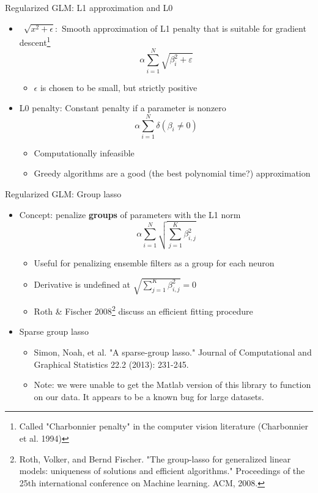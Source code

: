\documentclass[svgnames,13pt,handout]{beamer}
\DeclareRobustCommand{\emph}[1]{\textbf{{\color{emphasizecolor} #1}}}
\begin{document}
\begin{frame}{Regularized GLM: L1 approximation and L0}
\begin{itemize}
	\item <1->~$\sqrt{x^2+\epsilon}:$ Smooth approximation of L1 penalty that is suitable for gradient descent\footnote{Called "Charbonnier penalty" in the computer vision literature (Charbonnier et al. 1994)}\[ \alpha \sum_{i=1}^N \sqrt{\beta_i^2+\varepsilon} \]
	\begin{itemize}
		\item <2->$\epsilon$ is chosen to be small, but strictly positive
		\end{itemize}
	\item <3->L0 penalty: Constant penalty if a parameter is nonzero\[ \alpha \sum_{i=1}^N \delta(\beta_i\ne 0) \]
	\begin{itemize}
		\item <4->Computationally infeasible
		\item <5->Greedy algorithms are a good (the best polynomial time?) approximation
	\end{itemize}
\end{itemize}
\end{frame} 

\begin{frame}{Regularized GLM: Group lasso}
\begin{itemize}
	\item <1->Concept: penalize \emph{groups} of parameters with the L1 norm\[ \alpha \sum_{i=1}^N \sqrt{ \sum_{j=1}^K \beta_{i,j}^2 } \]
	\begin{itemize}
		\item <2->Useful for penalizing ensemble filters as a group for each neuron
		\item <3->Derivative is undefined at $\sqrt{ \sum_{j=1}^K \beta_{i,j}^2 }=0$
		\item <4->Roth \& Fischer 2008\footnote{Roth, Volker, and Bernd Fischer. "The group-lasso for generalized linear models: uniqueness of solutions and efficient algorithms." Proceedings of the 25th international conference on Machine learning. ACM, 2008.} discuss an efficient fitting procedure
		\end{itemize}
	\item <5->Sparse group lasso
	\begin{itemize}
		\item <6->Simon, Noah, et al. "A sparse-group lasso." Journal of Computational and Graphical Statistics 22.2 (2013): 231-245.
		\item <7->Note: we were unable to get the Matlab version of this library to function on our data. It appears to be a known bug for large datasets.\href{goo.gl/kFXMqU}{}
	\end{itemize}
\end{itemize}
\end{frame} 
\end{document}
